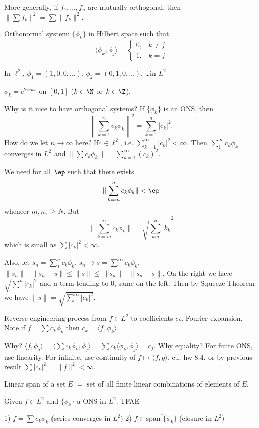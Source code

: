 More generally, if $f_1,\ldots,f_n$ are mutually orthogonal, then $\| \sum f_k \|^2= \sum \|f_k\|^2$. 


Orthonormal system: $\{ \phi_k\}$ in Hilbert space such that
	\[
	\langle \phi_k, \phi_j \rangle=
	\begin{cases}
	0, & k \neq j \\
	1, & k=j
	\end{cases}
	\]


\begin{ex}
In $\ell^2$, $\phi_1=(1,0,0,\ldots)$, $\phi_2= (0,1,0,\ldots)$, \dots in $L^2$
\end{ex}


\begin{ex}
$\phi_k = e^{2\pi i kx}$ on $[0,1]$ ($k \in \N$ or $k \in \Z$). 
\end{ex}


Why is it nice to have orthogonal systems? If $\{ \phi_k \}$ is an ONS, then 
	\[
	\left\| \sum_{k=1}^n c_k \phi_k \right\|^2= \sum_{k=1}^n |c_k|^2. 
	\]
How do we let $n \to \infty$ here? If$c \in \ell^2$, i.e. $\sum_{k=1}^\infty |c_k|^2<\infty$. Then $\sum_1^\infty c_k \phi_k$ converges in $L^2$ and $\| \sum c_k \phi_k\|= \sum_{k=1}^\infty (c_k)^2$.

\pf We need for all $\ep$ such that there exists
	\[
	\| \sum_{k=m}^n c_k \phi_k \| < \ep
	\]
wheneer $m,n, \geq N$. But
	\[
	\| \sum_{k=m}^n c_k \phi_k \| = \sqrt{\sum_{km}^n |k_k}^2
	\]
which is small as $\sum |c_k|^2< \infty$. 


Also, let $s_n= \sum_1^n c_k \phi_k$, $s_n \to s= \sum^\infty c_k \phi_k$. $\|s_n\| - \|s_n-s\| \leq \|s\| \leq \|s_n\| + \|s_n-s\|$. On the right we have $\sqrt{\sum^n |c_k|^2}$ and a term tending to 0, same on the left. Then by Squeeze Theorem we have $\|s\|= \sqrt{\sum^\infty |c_k|^2}$. 


Reverse engineering process from $f \in L^2$ to coefficients $c_k$. Fourier expansion. Note if $f= \sum c_k \phi_k$ then $c_k = \langle f, \phi_k \rangle$. 

Why? $\langle f, \phi_j \rangle = \langle \sum c_k \phi_k, \phi_j \rangle = \sum c_k \langle \phi_k, \phi_j \rangle= c_j$. Why equality? For finite ONS, use linearity. For infinite, use continuity of $f \mapsto \langle f,g \rangle$, c.f. hw 8.4. or by previous result $\sum |c_k|^2= \|f\|^2< \infty$. 


Linear span of a set $E$ $=$ set of all finite linear combinations of elements of $E$. 


\begin{thm}
Given $f \in L^2$ and $\{ \phi_k \}$ a ONS in $L^2$. TFAE

1) $f= \sum c_k \phi_k$ (series converges in $L^2$)
2) $f \in \overline{\text{span }\{\phi_k\}}$ (closure in $L^2$)
\end{thm}

